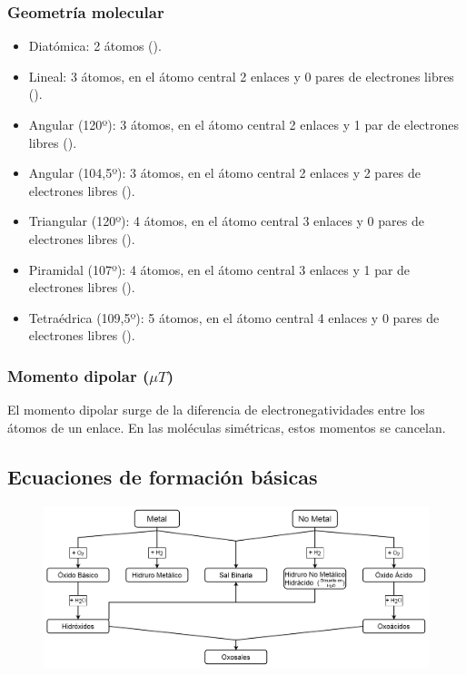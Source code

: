 \subsubsection*{Geometría molecular}

\begin{itemize}
    \item Diatómica: 2 átomos ().

    \item Lineal: 3 átomos, en el átomo central 2 enlaces y 0 pares de electrones libres (). 
    \item Angular (120º): 3 átomos, en el átomo central 2 enlaces y 1 par de electrones libres ().
    \item Angular (104,5º): 3 átomos, en el átomo central 2 enlaces y 2 pares de electrones libres ().
    \item Triangular (120º): 4 átomos, en el átomo central 3 enlaces y 0 pares de electrones libres ().
    \item Piramidal (107º): 4 átomos, en el átomo central 3 enlaces y 1 par de electrones libres ().
    \item Tetraédrica (109,5º): 5 átomos, en el átomo central 4 enlaces y 0 pares de electrones libres ().
\end{itemize}


\subsubsection*{Momento dipolar ($\mu T$)}

El momento dipolar surge de la diferencia de electronegatividades entre los átomos de un enlace. En las moléculas simétricas, estos momentos se cancelan. 


\subsection*{Ecuaciones de formación básicas}

\begin{figure}[H]
    \centering
    \includegraphics[width=0.9\linewidth]{Images/ecuaciones_formacion.png}
\end{figure}

